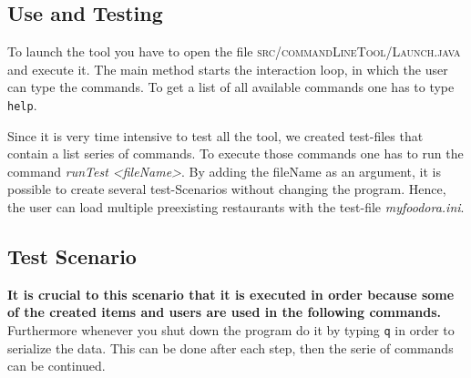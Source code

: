 \subsection{Use and Testing}
\label{sub:use_and_testing}

To launch the tool you have to open the file \textsc{src/commandLineTool/Launch.java} and execute
it. The main method starts the interaction loop, in which the user can type the commands. To get
a list of all available commands one has to type \lstinline|help|. 

Since it is very time intensive to test all the tool, we created test-files that
contain a list series of commands. To execute those commands one has to run the command 
\textit{runTest <fileName>}. By adding the fileName as an argument, it is possible to create 
several test-Scenarios without changing the program. Hence, the user can load multiple 
preexisting restaurants with the test-file \textit{my\textunderscore foodora.ini}.

\subsection{Test Scenario}
\label{sub:test_scenario}

\textbf{It is crucial to this scenario that it is executed in order because some of the created items and 
users are used in the following commands.} Furthermore whenever you shut down the program do it by
typing \lstinline|q| in order to serialize the data. This can be done after each step, then the 
serie of commands can be continued.

